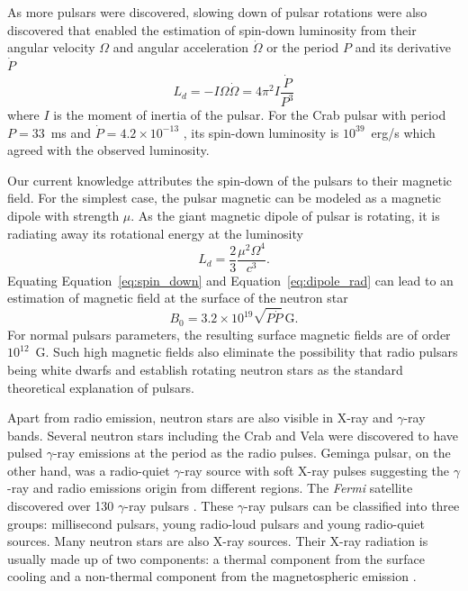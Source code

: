 As more pulsars were discovered, slowing down of pulsar rotations were also discovered that enabled the estimation of spin-down luminosity from their angular velocity $\Omega$ and angular acceleration $\dot{\Omega}$ or the period $P$ and its derivative $\dot{P}$
%
\begin{equation}\label{eq:spin_down}
	  L_{d} = -I\Omega\dot{\Omega} = 4\pi^2 I\frac{\dot{P}}{P^3}
\end{equation}
%
where $I$ is the moment of inertia of the pulsar.
For the Crab pulsar with period $P=33$~ms and $\dot{P}=4.2\times 10^{-13}$ \citep{1968IAUC.2113....1L}, its spin-down luminosity is $10^{39}$~erg/s which agreed with the observed luminosity.

Our current knowledge attributes the spin-down of the pulsars to their magnetic field. For the simplest case, the pulsar magnetic can be modeled as a magnetic dipole with strength $\mu$.
As the giant magnetic dipole of pulsar is rotating, it is radiating away its rotational energy at the luminosity
%
\begin{equation}\label{eq:dipole_rad}
	L_{d} = \frac{2}{3}\frac{\mu^2\Omega^4}{c^3}.
\end{equation}
%
Equating Equation~\ref{eq:spin_down}  and Equation~\ref{eq:dipole_rad} can lead to an estimation of magnetic field at the surface of the neutron star
%
\begin{equation}
		B_0 = 3.2\times 10^{19}\sqrt{P \dot{P}}\,\mathrm{G}.
\end{equation}
%
For normal pulsars parameters, the resulting surface magnetic fields are of order $10^{12}$~G.
Such high magnetic fields also eliminate the possibility that radio pulsars being white dwarfs and establish rotating neutron stars as the standard theoretical explanation of pulsars.

Apart from radio emission, neutron stars are also visible in X-ray and $\gamma$-ray bands. Several neutron stars including the Crab \citep{1974Natur.251..397K} and Vela \citep{1975ApJ...200L..79T} were discovered to have pulsed $\gamma$-ray emissions at the period as the radio pulses. 
Geminga pulsar, on the other hand, was a radio-quiet $\gamma$-ray source with soft X-ray pulses \citep{1992Natur.357..222H} suggesting the $\gamma$-ray and radio emissions origin from different regions.
The {\it Fermi} satellite discovered over 130 $\gamma$-ray pulsars \citep{2010ApJS..188..405A}.
These $\gamma$-ray pulsars can be classified into three groups: millisecond pulsars, young radio-loud pulsars and young radio-quiet sources.
 Many neutron stars are also X-ray sources. Their X-ray radiation is usually made up of two components: a thermal component from the surface cooling and a non-thermal component from the magnetospheric emission \citep{2006csxs.book..279K}.
 
